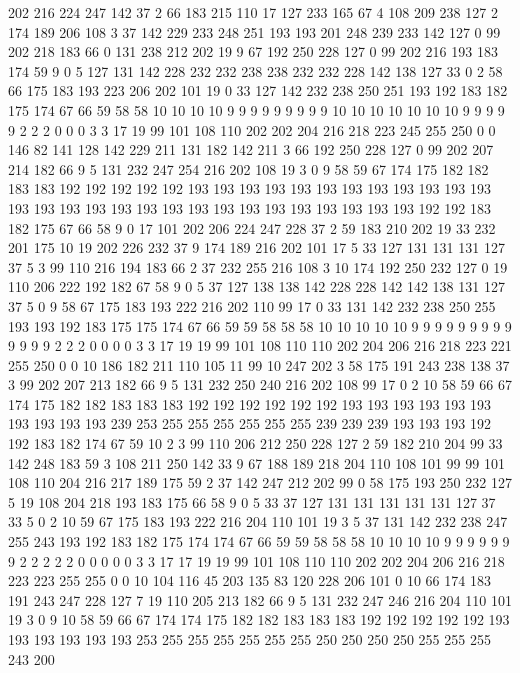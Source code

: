 202 216 224 247 142 37 2 66 183 215 110 17 127 233 165 67 4 108 209 238
127 2 174 189 206 108 3 37 142 229 233 248 251 193 193 201 248 239 233 142
127 0 99 202 218 183 66 0 131 238 212 202 19 9 67 192 250 228 127 0
99 202 216 193 183 174 59 9 0 5 127 131 142 228 232 232 238 238 232 232
228 142 138 127 33 0 2 58 66 175 183 193 223 206 202 101 19 0 33 127
142 232 238 250 251 193 192 183 182 175 174 67 66 59 58 58 10 10 10 10
9 9 9 9 9 9 9 9 9 10 10 10 10 10 10 10 9 9 9 9
9 2 2 2 0 0 0 3 3 17 19 99 101 108 110 202 202 204 216 218
223 245 255 250 0 0 146 82 141 128 142 229 211 131 182 142 211 3 66 192
250 228 127 0 99 202 207 214 182 66 9 5 131 232 247 254 216 202 108 19
3 0 9 58 59 67 174 175 182 182 183 183 192 192 192 192 192 193 193 193
193 193 193 193 193 193 193 193 193 193 193 193 193 193 193 193 193 193 193 193
193 193 193 193 193 192 192 183 182 175 67 66 58 9 0 17 101 202 206 224
247 228 37 2 59 183 210 202 19 33 232 201 175 10 19 202 226 232 37 9
174 189 216 202 101 17 5 33 127 131 131 131 127 37 5 3 99 110 216 194
183 66 2 37 232 255 216 108 3 10 174 192 250 232 127 0 19 110 206 222
192 182 67 58 9 0 5 37 127 138 138 142 228 228 142 142 138 131 127 37
5 0 9 58 67 175 183 193 222 216 202 110 99 17 0 33 131 142 232 238
250 255 193 193 192 183 175 175 174 67 66 59 59 58 58 58 10 10 10 10
10 9 9 9 9 9 9 9 9 9 9 9 9 9 2 2 2 0 0 0
0 3 3 17 19 19 99 101 108 110 110 202 204 206 216 218 223 221 255 250
0 0 10 186 182 211 110 105 11 99 10 247 202 3 58 175 191 243 238 138
37 3 99 202 207 213 182 66 9 5 131 232 250 240 216 202 108 99 17 0
2 10 58 59 66 67 174 175 182 182 183 183 183 192 192 192 192 192 192 193
193 193 193 193 193 193 193 193 193 239 253 255 255 255 255 255 255 239 239 239
193 193 193 192 192 183 182 174 67 59 10 2 3 99 110 206 212 250 228 127
2 59 182 210 204 99 33 142 248 183 59 3 108 211 250 142 33 9 67 188
189 218 204 110 108 101 99 99 101 108 110 204 216 217 189 175 59 2 37 142
247 212 202 99 0 58 175 193 250 232 127 5 19 108 204 218 193 183 175 66
58 9 0 5 33 37 127 131 131 131 131 131 127 37 33 5 0 2 10 59
67 175 183 193 222 216 204 110 101 19 3 5 37 131 142 232 238 247 255 243
193 192 183 182 175 174 174 67 66 59 59 58 58 58 10 10 10 10 9 9
9 9 9 9 9 2 2 2 2 2 0 0 0 0 0 3 3 17 17 19
19 99 101 108 110 110 202 202 204 206 216 218 223 223 255 255 0 0 10 104
116 45 203 135 83 120 228 206 101 0 10 66 174 183 191 243 247 228 127 7
19 110 205 213 182 66 9 5 131 232 247 246 216 204 110 101 19 3 0 9
10 58 59 66 67 174 174 175 182 182 183 183 183 192 192 192 192 192 193 193
193 193 193 193 253 255 255 255 255 255 255 250 250 250 250 255 255 255 243 200
